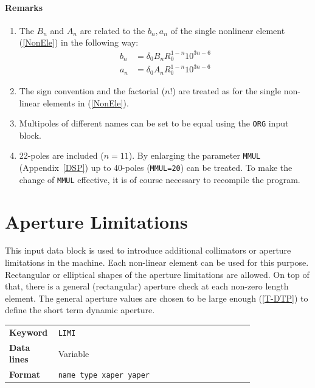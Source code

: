 \paragraph{Remarks}
\begin{enumerate}
    \item The $B_{n}$ and $A_{n}$ are related to the $b_{n}, a_{n}$ of the single nonlinear element (\ref{NonEle}) in the following way:
        \begin{align*}
            b_{n} &= \delta_{0} B_{n} R_{0}^{1-n} 10^{3n-6} \\
            a_{n} &= \delta_{0} A_{n} R_{0}^{1-n} 10^{3n-6}
        \end{align*}
    \item The sign convention and the factorial ($n$!) are treated as for the single non-linear elements in (\ref{NonEle}).
    \item Multipoles of different names can be set to be equal using the \texttt{ORG} input block.
    \item 22-poles are included ($n=11$). By enlarging the parameter \texttt{MMUL} (Appendix~\ref{DSP}) up to 40-poles (\texttt{MMUL=20}) can be treated. To make the change of \texttt{MMUL} effective, it is of course necessary to recompile the program.
\end{enumerate}

\section{Aperture Limitations} \label{ApeLim}

This input data block is used to introduce additional collimators or aperture limitations in the machine.
Each non-linear element can be used for this purpose.
Rectangular or elliptical shapes of the aperture limitations are allowed.
On top of that, there is a general (rectangular) aperture check at each non-zero length element.
The general aperture values are chosen to be large enough (\ref{T-DTP}) to define the short term dynamic aperture.

\bigskip
\begin{tabular}{@{}lp{0.8\linewidth}}
    \textbf{Keyword}    & \texttt{LIMI} \\
    \textbf{Data lines} & Variable \\
    \textbf{Format}     & \texttt{name type xaper yaper}
\end{tabular}

